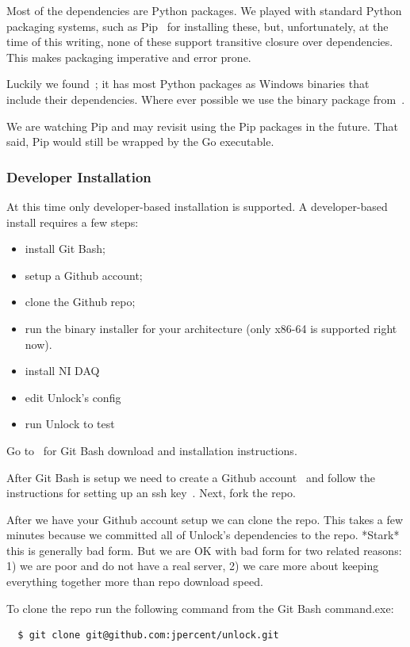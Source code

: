 \documentclass[11pt]{article}
\begin{document}
Most of the dependencies are Python packages.  We played with standard Python packaging systems, such as Pip~\cite{pip} for installing these, but, unfortunately, at the time of this writing, none of these support transitive closure over dependencies.  This makes packaging imperative and error prone.  

Luckily we found~\cite{winpythonpackages}; it has most Python packages as Windows binaries that include their dependencies.  Where ever possible we use the binary package from~\cite{winpythonpackages}.  

We are watching Pip and may revisit using the Pip packages in the future.  That said, Pip would still be wrapped by the Go executable.

\subsubsection{Developer Installation}\label{developerinstallsec}

At this time only developer-based installation is supported.  A developer-based install requires a few steps:
\begin{itemize}
\item install Git Bash;
\item setup a Github account;
\item clone the Github repo;
\item run the binary installer for your architecture (only x86-64 is supported right now).
\item install NI DAQ
\item edit Unlock's config
\item run Unlock to test
\end{itemize}

Go to~\cite{gitbash} for Git Bash download and installation instructions.  

After Git Bash is setup we need to create a Github account~\cite{github} and follow the instructions for setting up an ssh key~\cite{sshkey}.  Next, fork the repo.

After we have your Github account setup we can clone the repo.  This takes a few minutes because we committed all of Unlock's dependencies to the repo.  *Stark* this is generally bad form.  But we are OK with bad form for two related reasons: 1) we are poor and do not have a real server, 2) we care more about keeping everything together more than repo download speed.

To clone the repo run the following command from the Git Bash command.exe:
\begin{verbatim}  
  $ git clone git@github.com:jpercent/unlock.git
\end{verbatim}
\end{document}
